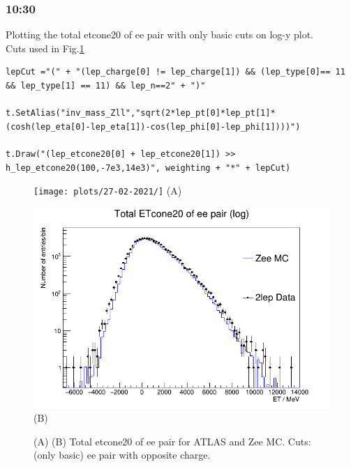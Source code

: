 \subsubsection*{10:30}
Plotting the total etcone20 of ee pair with only basic cuts on log-y plot.
\\
Cuts used in Fig.\ref{}
\begin{lstlisting}
lepCut ="(" + "(lep_charge[0] != lep_charge[1]) && (lep_type[0]== 11 && lep_type[1] == 11) && lep_n==2" + ")"    
    
t.SetAlias("inv_mass_Zll","sqrt(2*lep_pt[0]*lep_pt[1]*(cosh(lep_eta[0]-lep_eta[1])-cos(lep_phi[0]-lep_phi[1])))")

t.Draw("(lep_etcone20[0] + lep_etcone20[1]) >> h_lep_etcone20(100,-7e3,14e3)", weighting + "*" + lepCut)
\end{lstlisting}
\begin{figure}[h!]
    \centering
    \begin{minipage}{0.5\textwidth}
        \centering
        \texttt{[image: plots/27-02-2021/]}
        (A)
    \end{minipage}\hfill
    \begin{minipage}{0.5\textwidth}
        \centering
        \includegraphics[width=\linewidth]{plots/27-02-2021/2-Stack-Zee-fast_total-etcone_(basic-cuts_ee-pair-opp-c)_27-02-21_10-35.png}
        (B)
    \end{minipage}
    \caption{(A)  (B) Total etcone20 of ee pair for ATLAS and Zee MC. Cuts: (only basic) ee pair with opposite charge.}
    \label{}
\end{figure}

